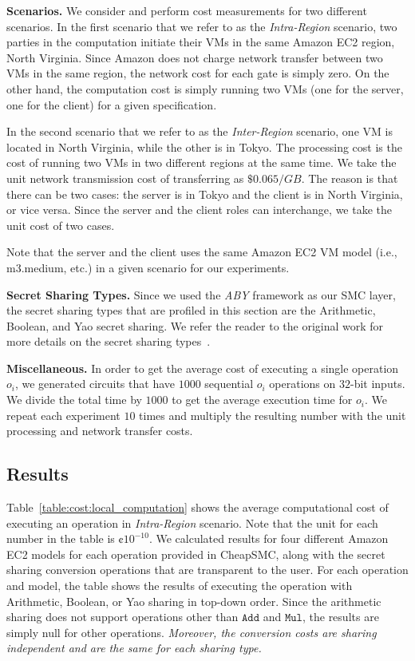 \documentclass{llncs}
\newcommand{\sysname}{{CheapSMC}\xspace}
\begin{document}
\vspace{-1.0cm}
\textbf{Scenarios.} We consider and perform cost measurements for two different scenarios. In the first scenario that we refer to as the \emph{Intra-Region} scenario, two parties in the computation initiate their VMs in the same Amazon EC2 region, North Virginia. Since Amazon does not charge network transfer between two VMs in the same region, the network cost for each gate is simply zero. On the other hand, the computation cost is simply running two VMs (one for the server, one for the client) for a given specification. 

In the second scenario that we refer to as the \emph{Inter-Region} scenario, one VM is located in North Virginia, while the other is in Tokyo. The processing cost is the cost of running two VMs in two different regions at the same time. We take the unit network transmission cost of transferring as $\$0.065/GB$. The reason is that there can be two cases: the server is in Tokyo and the client is in North Virginia, or vice versa. 
Since the server and the client roles can interchange, we take the unit cost of two cases.

Note that the server and the client uses the same Amazon EC2 VM model (i.e., m3.medium, etc.) in a given scenario for our experiments. 

\textbf{Secret Sharing Types.} Since we used the \emph{ABY} framework as our SMC layer, the secret sharing types that are profiled in this section are the Arithmetic, Boolean, and Yao secret sharing. We refer the reader to the original work for more details on the secret sharing types~\cite{cite:demmler2015aby}.

\textbf{Miscellaneous.} In order to get the average cost of executing a single operation $o_i$, we generated circuits that have $1000$ sequential $o_i$ operations on $32$-bit inputs. We divide the total time by $1000$ to get the average execution time for $o_i$. We repeat each experiment $10$ times and multiply the resulting number with the unit processing and network transfer costs. 

\vspace{-0.5cm}
\subsection{Results}
\label{sec:cost:results}

Table~\ref{table:cost:local_computation} shows the average computational cost of executing an operation in \emph{Intra-Region} scenario. Note that the unit for each number in the table is $\cent10^{-10}$. We calculated results for four different Amazon EC2 models for each operation provided in \sysname, along with the secret sharing conversion operations that are transparent to the user. For each operation and model, the table shows the results of executing the operation with Arithmetic, Boolean, or Yao sharing in top-down order. Since the arithmetic sharing does not support operations other than $\mathtt{Add}$ and $\mathtt{Mul}$, the results are simply null for other operations. \textit{Moreover, the conversion costs are sharing independent and are the same for each sharing type.} 
\end{document}
